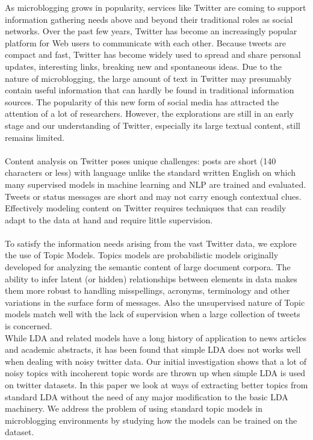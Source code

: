 \documentclass[10pt,a5paper,twoside]{article}
\begin{document}
As microblogging grows in popularity, services like Twitter are coming to support information gathering needs above and beyond their traditional roles as social networks. Over the past few years, Twitter has become an increasingly popular platform for Web users to communicate with each other. Because tweets are compact and fast, Twitter has become widely used to spread and share personal updates, interesting links, breaking new and spontaneous ideas. Due to the nature of microblogging, the large amount of text in Twitter may presumably contain useful information that can hardly be found in traditional information sources. The popularity of this new form of social media has attracted the attention of a lot of researchers. However, the explorations are still in an early stage and our understanding of Twitter, especially its large textual content, still remains limited.
\\\\
Content analysis on Twitter poses unique challenges: posts are short (140 characters or less) with language unlike the standard written English on which
many supervised models in machine learning and NLP are trained and evaluated. Tweets or status messages are short and may not carry enough contextual clues. Effectively modeling content on Twitter requires techniques that can readily adapt to the data at hand and require little supervision.
\\\\
To satisfy the information needs arising from the vast Twitter data, we explore the use of Topic Models. Topics models are probabilistic models originally developed for analyzing the semantic content of large document corpora. The ability to infer latent (or hidden) relationships between elements in data makes them more robust to handling misspellings, acronyms, terminology and other variations in the surface form of messages. Also the unsupervised nature of Topic models match well with the lack of supervision when a large collection of tweets is concerned. 
\\
While LDA and related models have a long history of application to news articles and academic abstracts, it has been found that simple LDA does not works well when dealing with noisy twitter data. Our initial investigation shows that a lot of noisy topics with incoherent topic words are thrown up when simple LDA is used on twitter datasets. In this paper we look at ways of extracting better topics from standard LDA without the need of any major modification to the basic LDA machinery. We address the problem of using standard topic models in microblogging environments by studying how the models can be trained on the dataset. 
\\
\end{document}
